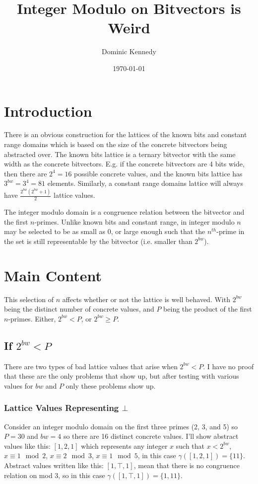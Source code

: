 \documentclass[12pt]{article}
\title{Integer Modulo on Bitvectors is Weird}
\author{Dominic Kennedy}
\date{\today}
\begin{document}
\maketitle

\section{Introduction}
There is an obvious construction for the lattices of the known bits and constant range domains which is based on the size of the concrete bitvectors being abstracted over.
The known bits lattice is a ternary bitvector with the same width as the concrete bitvectors.
E.g. if the concrete bitvectors are 4 bits wide, then there are $2^4 = 16$ possible concrete values, and the known bits lattice has $3^{bw} = 3^4 = 81$ elements.
Similarly, a constant range domains lattice will always have $\frac{2^{bw}(2^{bw}+1)}{2}$ lattice values.

The integer modulo domain is a congruence relation between the bitvector and the first $n$-primes.
Unlike known bits and constant range,
in integer modulo $n$ may be selected to be as small as 0, or large enough such that the $n^{th}$-prime in the set is still representable by the bitvector
(i.e. smaller than $2^{bw}$).

\section{Main Content}

This selection of $n$ affects whether or not the lattice is well behaved.
With $2^{bw}$ being the distinct number of concrete values, and $P$ being the product of the first $n$-primes.
Either, $2^{bw} < P$, or $2^{bw} \geq P$.

\subsection{If $2^{bw} < P$}

There are two types of bad lattice values that arise when $2^{bw} < P$.
I have no proof that these are the only problems that show up, but after testing with various values for $bw$ and $P$ only these problems show up.

\subsubsection{Lattice Values Representing $\bot$}

Consider an integer modulo domain on the first three primes (2, 3, and 5) so $P = 30$ and $bw = 4$ so there are 16 distinct concrete values.
I'll show abstract values like this: $[1, 2, 1]$ which represents any integer $x$ such that
$x < 2^{bw}$, $x \equiv 1 \mod 2$, $x \equiv 2 \mod 3$, $x \equiv 1 \mod 5$, in this case $\gamma([1, 2, 1])=\{11\}$.
Abstract values written like this: $[1, \top, 1]$, mean that there is no congruence relation on mod 3, so in this case $\gamma([1, \top, 1])=\{1, 11\}$.
\end{document}
